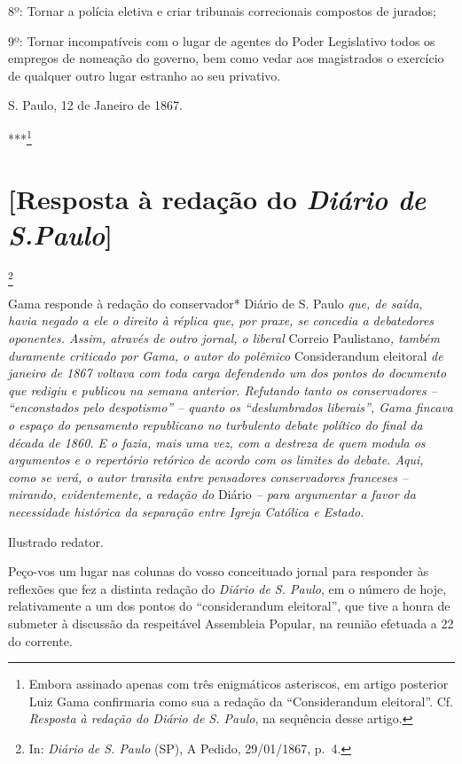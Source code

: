 8º: Tornar a polícia eletiva e criar tribunais correcionais compostos de
jurados;

9º: Tornar incompatíveis com o lugar de agentes do Poder Legislativo
todos os empregos de nomeação do governo, bem como vedar aos magistrados
o exercício de qualquer outro lugar estranho ao seu privativo.

S. Paulo, 12 de Janeiro de 1867.

***\footnote{Embora assinado apenas com três enigmáticos asteriscos,
  em artigo posterior Luiz Gama confirmaria como sua a redação da
  ``Considerandum eleitoral''. Cf. \emph{Resposta à redação do Diário de
  S. Paulo}, na sequência desse artigo.}

\chapter{{[}Resposta à redação do \emph{Diário de S.Paulo}{]}}\footnote{In:
  \emph{Diário de S. Paulo} (SP), A Pedido, 29/01/1867, p.~4.}

\begin{didascalia}
Gama responde à redação do conservador* Diário de S. Paulo \emph{que, de
saída, havia negado a ele o direito à réplica que, por praxe, se
concedia a debatedores oponentes. Assim, através de outro jornal, o
liberal} Correio Paulistano\emph{, também duramente criticado por Gama,
o autor do polêmico} Considerandum eleitoral \emph{de janeiro de 1867
voltava com toda carga defendendo um dos pontos do documento que redigiu
e publicou na semana anterior. Refutando tanto os conservadores --
``enconstados pelo despotismo'' -- quanto os ``deslumbrados liberais'', Gama
fincava o espaço do pensamento republicano no turbulento debate político
do final da década de 1860. E o fazia, mais uma vez, com a destreza de
quem modula os argumentos e o repertório retórico de acordo com os
limites do debate. Aqui, como se verá, o autor transita entre pensadores
conservadores franceses -- mirando, evidentemente, a redação do} Diário
\emph{-- para argumentar a favor da necessidade histórica da separação
entre Igreja Católica e Estado.}
\end{didascalia}

\asterisc{}

Ilustrado redator.

Peço-vos um lugar nas colunas do vosso conceituado jornal para responder
às reflexões que fez a distinta redação do \emph{Diário de S. Paulo}, em
o número de hoje, relativamente a um dos pontos do ``considerandum
eleitoral'', que tive a honra de submeter à discussão da respeitável
Assembleia Popular, na reunião efetuada a 22 do corrente.

